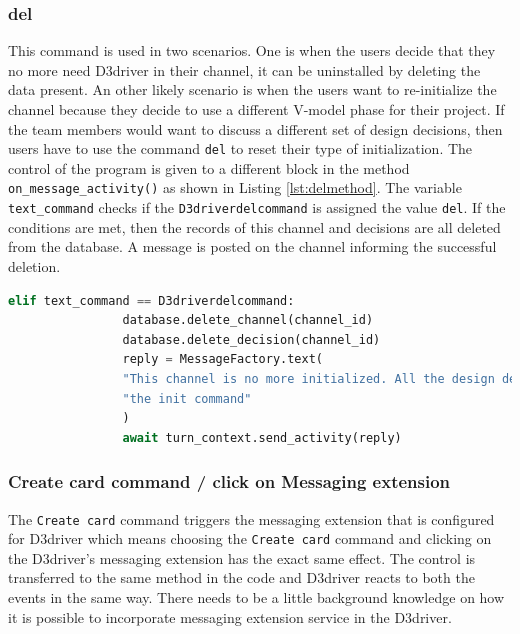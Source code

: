 \subsubsection{\textbf{del}}
\label{del}

This command is used in two scenarios. One is when the users decide that they no more need D3driver in their channel, it can be uninstalled by deleting the data present. An other likely scenario is when the users want to re-initialize the channel because they decide to use a different V-model phase for their project. If the team members would want to discuss a different set of design decisions, then users have to use the command \texttt{del} to reset their type of initialization. The control of the program is given to a different block in the method \texttt{on\_message\_activity()} as shown in Listing \ref{lst:delmethod}. The variable \texttt{text\_command} checks if the \texttt{D3driverdelcommand} is assigned the value \texttt{del}. If the conditions are met, then the records of this channel and decisions are all deleted from the database. A message is posted on the channel informing the successful deletion.
 
\begin{lstlisting}[caption={del command handling},label={lst:delmethod},language=python]
elif text_command == D3driverdelcommand:
                database.delete_channel(channel_id)
                database.delete_decision(channel_id)
                reply = MessageFactory.text(
                "This channel is no more initialized. All the design decsions(if discussed) has been deleted from the database. Plase click on 'Export to PDF' button in D3driver tab to save all the data to your local device. To re-initialize the channel, please enter "
                "the init command"
                )
                await turn_context.send_activity(reply)
\end{lstlisting}


\subsubsection{\textbf{Create card command / click on Messaging extension}}
\label{me}
The \texttt{Create card} command triggers the messaging extension that is configured for D3driver which means choosing the \texttt{Create card} command and clicking on the D3driver's messaging extension has the exact same effect. The control is transferred to the same method in the code and D3driver reacts to both the events in the same way. There needs to be a little background knowledge on how it is possible to incorporate messaging extension service in the D3driver.  


